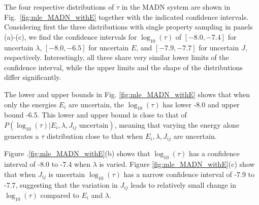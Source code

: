 \documentclass[%
 reprint,
superscriptaddress,
 amsmath,amssymb,
 aps,
prb,
floatfix
]{revtex4-2}
\newcommand{\bjoern}[2]{{\color{blue}{{\bf #1} #2}}}
\begin{document}

The four respective distributions of $\tau$ in the MADN system are shown in Fig.~\ref{fig:mle_MADN_withE} together with the indicated confidence intervals. Considering first the three distributions with single property sampling in panels (a)-(c), we find the confidence intervals for $\log_{10}(\tau)$ of $[-8.0,-7.4]$ for uncertain $\lambda$, $[-8.0,-6.5]$ for uncertain $E$, and $[-7.9,-7.7]$ for uncertain $J$, respectively. Interestingly, all three share very similar lower limits of the confidence interval, while the upper limits and the shape of the distributions differ significantly. 
\bjoern{STOP}{HERE}


The lower and upper bounds in Fig. \ref{fig:mle_MADN_withE} shows that when only the energies $E_i$ are uncertain, the $\log_{10}(\tau)$ has lower -8.0 and upper bound -6.5. This lower and upper bound is close to that of $P(\log_{10}(\tau)|E_i, \lambda, J_{ij} \text{ uncertain})$, meaning that varying the energy alone generates a $\tau$ distribution close to that when $E_i, \lambda, J_{ij}$ are uncertain. 

Figure .\ref{fig:mle_MADN_withE}(b) shows that $\log_{10}(\tau)$ has a confidence interval of -8.0 to -7.4 when $\lambda$ is varied. 
Figure \ref{fig:mle_MADN_withE}(c) show that when $J_{ij}$ is uncertain $\log_{10}(\tau)$ has a narrow confidence interval of -7.9 to -7.7, suggesting that the variation in $J_{ij}$ leads to relatively small change in $\log_{10}(\tau)$ compared to $E_i$ and $\lambda$.
\end{document}
